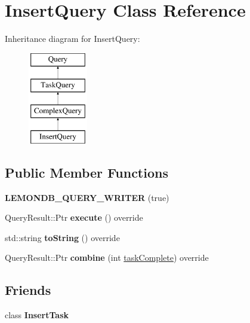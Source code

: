 \hypertarget{class_insert_query}{}\section{Insert\+Query Class Reference}
\label{class_insert_query}
Inheritance diagram for Insert\+Query\+:\begin{figure}[H]
\begin{center}
\leavevmode
\includegraphics[height=4.000000cm]{class_insert_query}
\end{center}
\end{figure}
\subsection*{Public Member Functions}
\begin{DoxyCompactItemize}
\item 
\mbox{\label{class_insert_query_a7f00e4f5ba3c1176c246095279768d84}} 
{\bfseries L\+E\+M\+O\+N\+D\+B\+\_\+\+Q\+U\+E\+R\+Y\+\_\+\+W\+R\+I\+T\+ER} (true)
\item 
\mbox{\label{class_insert_query_acc4b700893c1c317db7a347d82ab548d}} 
Query\+Result\+::\+Ptr {\bfseries execute} () override
\item 
\mbox{\label{class_insert_query_aab9bd4260dbc60e073e7ca7d875d8dd8}} 
std\+::string {\bfseries to\+String} () override
\item 
\mbox{\label{class_insert_query_a4cdcd69fce64e1910eef37ffe802a86d}} 
Query\+Result\+::\+Ptr {\bfseries combine} (int \hyperlink{class_task_query_a3dc3e4c56ddea8ff025239fd9da358d3}{task\+Complete}) override
\end{DoxyCompactItemize}
\subsection*{Friends}
\begin{DoxyCompactItemize}
\item 
\mbox{\label{class_insert_query_a046ec31f5d7d865cd0cbe8b34cd2a108}} 
class {\bfseries Insert\+Task}
\end{DoxyCompactItemize}
